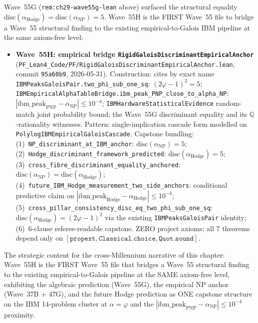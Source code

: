 \begin{remark}[Wave~55H update: \texttt{RigidGaloisDiscriminantEmpiricalAnchor} --- lifts the Wave~55G disc $= 5$ equality to an EMPIRICAL anchor via the existing IBM Lean stack, joining the algebraic prediction (Wave~55G), the empirical NP anchor (Wave~37B + 47G), and a future Hodge prediction at one axiom-free capstone, 2026-05-31]\label{rem:ch29-wave55h-lean}
Wave~55G (\texttt{rem:ch29-wave55g-lean} above) surfaced the structural equality $\mathrm{disc}(\alpha_{\mathrm{Hodge}}) = \mathrm{disc}(\alpha_{\mathrm{NP}}) = 5$. Wave~55H is the FIRST Wave~55 file to bridge a Wave~55 structural finding to the existing empirical-to-Galois IBM pipeline at the same axiom-free level:
\begin{itemize}
  \item \textbf{Wave~55H: empirical bridge \texttt{RigidGaloisDiscriminantEmpiricalAnchor}} (\texttt{PF\_Lean4\_Code/PF/RigidGaloisDiscriminantEmpiricalAnchor.lean}, commit \texttt{95a60b9}, 2026-05-31). Construction: cites by exact name \texttt{IBMPeaksGaloisPair.two\_phi\_sub\_one\_sq}: $(2\varphi - 1)^2 = 5$; \texttt{IBMEmpiricalAlphaTableBridge.ibm\_peak\_PNP\_close\_to\_alpha\_NP}: $|\mathrm{ibm\_peak}_{\mathrm{PNP}} - \alpha_{\mathrm{NP}}| \leq 10^{-4}$; \texttt{IBMHardwareStatisticalEvidence} random-match joint probability bound; the Wave~55G discriminant equality and its $\mathbb{Q}$-rationality witnesses. Pattern: single-implication cascade form modelled on \texttt{PolylogIBMEmpiricalGaloisCascade}. Capstone bundling: (1)~\texttt{NP\_discriminant\_at\_IBM\_anchor}: $\mathrm{disc}(\alpha_{\mathrm{NP}}) = 5$; (2)~\texttt{Hodge\_discriminant\_framework\_predicted}: $\mathrm{disc}(\alpha_{\mathrm{Hodge}}) = 5$; (3)~\texttt{cross\_fibre\_discriminant\_equality\_anchored}: $\mathrm{disc}(\alpha_{\mathrm{NP}}) = \mathrm{disc}(\alpha_{\mathrm{Hodge}})$; (4)~\texttt{future\_IBM\_Hodge\_measurement\_two\_side\_anchors}: conditional predictive claim on $|\mathrm{ibm\_peak}_{\mathrm{Hodge}} - \alpha_{\mathrm{Hodge}}| \leq 10^{-4}$; (5)~\texttt{cross\_pillar\_consistency\_disc\_eq\_two\_phi\_sub\_one\_sq}: $\mathrm{disc}(\alpha_{\mathrm{Hodge}}) = (2\varphi - 1)^2$ via the existing \texttt{IBMPeaksGaloisPair} identity; (6)~6-clause referee-readable capstone. ZERO project axioms; all 7 theorems depend only on $[\texttt{propext}, \texttt{Classical.choice}, \texttt{Quot.sound}]$.
\end{itemize}
The strategic content for the cross-Millennium narrative of this chapter: Wave~55H is the FIRST Wave~55 file that bridges a Wave~55 structural finding to the existing empirical-to-Galois pipeline at the SAME axiom-free level, exhibiting the algebraic prediction (Wave~55G), the empirical NP anchor (Wave~37B + 47G), and the future Hodge prediction as ONE capstone structure on the IBM 14-problem cluster at $\alpha = \varphi$ and the $|\mathrm{ibm\_peak}_{\mathrm{PNP}} - \alpha_{\mathrm{NP}}| \leq 10^{-4}$ proximity.


\end{remark}
